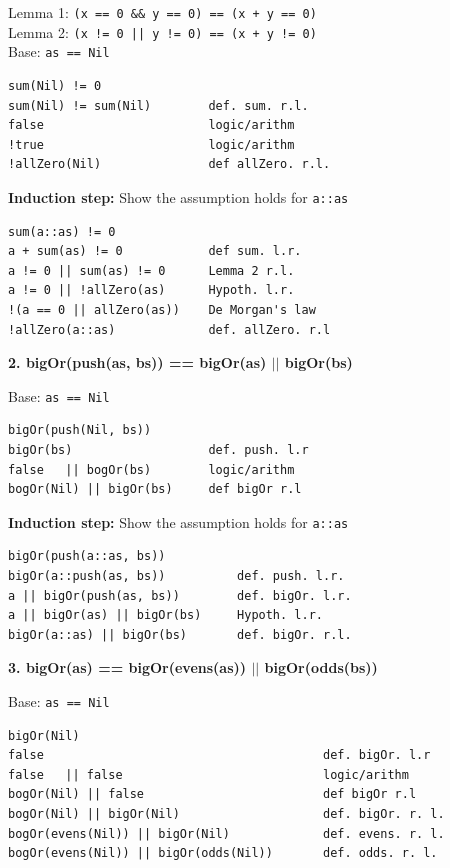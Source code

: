 \documentclass[10pt, a4paper]{article}
\begin{document}
Lemma 1: \texttt{(x == 0 \&\& y == 0) == (x + y == 0)}    \\
Lemma 2: \texttt{(x != 0 || y != 0) == (x + y != 0)} \\
Base: \texttt{as == Nil}
\begin{verbatim}
sum(Nil) != 0
sum(Nil) != sum(Nil)        def. sum. r.l.
false                       logic/arithm
!true                       logic/arithm
!allZero(Nil)               def allZero. r.l.
\end{verbatim}

\textbf{Induction step:} Show the assumption holds for \texttt{a::as}

\begin{verbatim}
sum(a::as) != 0 
a + sum(as) != 0            def sum. l.r.
a != 0 || sum(as) != 0      Lemma 2 r.l.
a != 0 || !allZero(as)      Hypoth. l.r.
!(a == 0 || allZero(as))    De Morgan's law
!allZero(a::as)             def. allZero. r.l
\end{verbatim}

\newpage

\begin{center}
\textbf{2. bigOr(push(as, bs)) == bigOr(as) $||$ bigOr(bs)}
\end{center}

Base: \texttt{as == Nil}
\begin{verbatim}
bigOr(push(Nil, bs))
bigOr(bs)                   def. push. l.r
false   || bogOr(bs)        logic/arithm
bogOr(Nil) || bigOr(bs)     def bigOr r.l
\end{verbatim}

\textbf{Induction step:} Show the assumption holds for \texttt{a::as}

\begin{verbatim}
bigOr(push(a::as, bs))
bigOr(a::push(as, bs))          def. push. l.r.
a || bigOr(push(as, bs))        def. bigOr. l.r.
a || bigOr(as) || bigOr(bs)     Hypoth. l.r.
bigOr(a::as) || bigOr(bs)       def. bigOr. r.l.
\end{verbatim}

\vspace{2cm}

\begin{center}
\textbf{3. bigOr(as) == bigOr(evens(as)) $||$ bigOr(odds(bs))}
\end{center}

Base: \texttt{as == Nil}
\begin{verbatim}
bigOr(Nil)
false                                       def. bigOr. l.r
false   || false                            logic/arithm
bogOr(Nil) || false                         def bigOr r.l
bogOr(Nil) || bigOr(Nil)                    def. bigOr. r. l.
bogOr(evens(Nil)) || bigOr(Nil)             def. evens. r. l.
bogOr(evens(Nil)) || bigOr(odds(Nil))       def. odds. r. l.
\end{verbatim}
\end{document}
